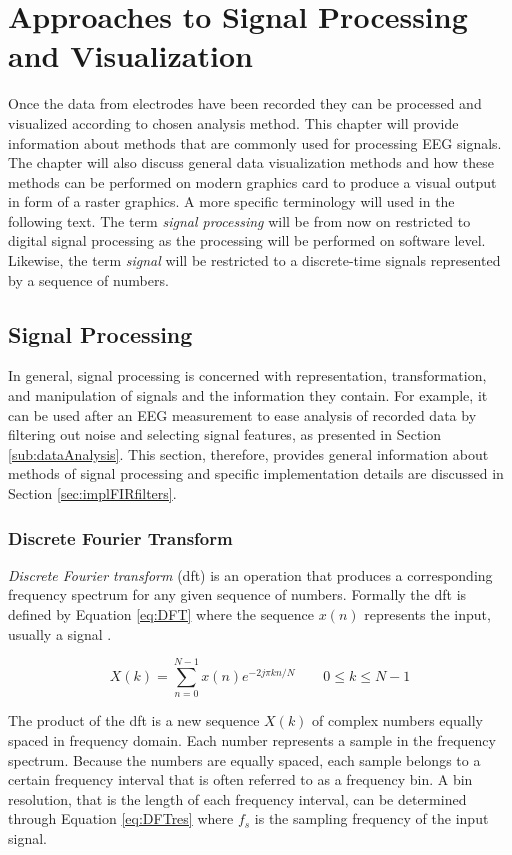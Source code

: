 \chapter{Approaches to Signal Processing and Visualization} \label{appProcVis}
Once the data from electrodes have been recorded they can be processed and visualized according to chosen analysis method. This chapter will provide information about methods that are commonly used for processing EEG signals. The chapter will also discuss general data visualization methods and how these methods can be performed on modern graphics card to produce a visual output in form of a raster graphics.
A more specific terminology will used in the following text. The term \emph{signal processing} will be from now on restricted to digital signal processing as the processing will be performed on software level. Likewise, the term \emph{signal} will be restricted to a discrete-time signals represented by a sequence of numbers. 

\section{Signal Processing} \label{sec:sigProc}
In general, signal processing is concerned with representation, transformation, and manipulation of signals and the information they contain. For example, it can be used after an EEG measurement to ease analysis of recorded data by filtering out noise and selecting signal features, as presented in Section \ref{sub:dataAnalysis}. This section, therefore, provides general information about
methods of signal processing and specific implementation details are discussed in Section \ref{sec:implFIRfilters}. 

\subsection{Discrete Fourier Transform}
\emph{Discrete Fourier transform} (\gls{dft}) is an operation that produces a corresponding frequency spectrum for any given sequence of numbers. Formally the \gls{dft} is defined by Equation \ref{eq:DFT} where the sequence $x(n)$ represents the input, usually a signal \cite[p. 401]{DSP3}. 

\begin{equation}
\label{eq:DFT}
	X(k) = \sum\limits_{n=0}^{N - 1}x(n)e^{-2 j \pi k n /N} \qquad 0 \leq k \leq N-1
\end{equation}

The product of the \gls{dft} is a new sequence $X(k)$ of complex numbers equally spaced in frequency domain. Each number represents a sample in the frequency spectrum. Because the numbers are equally spaced, each sample belongs to a certain frequency interval that is often referred to as a frequency bin. A bin resolution, that is the length of each frequency interval, can be determined through Equation \ref{eq:DFTres} where $f_s$ is the sampling frequency of the input signal. 

